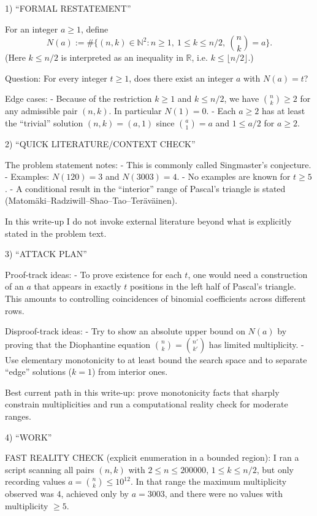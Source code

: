 1) “FORMAL RESTATEMENT”

For an integer $a\ge 1$, define
\[
N(a):=\#\{(n,k)\in\mathbb{N}^2: n\ge 1,\ 1\le k\le n/2,\ \binom{n}{k}=a\}.
\]
(Here $k\le n/2$ is interpreted as an inequality in $\mathbb{R}$, i.e. $k\le \lfloor n/2\rfloor$.)

Question: For every integer $t\ge 1$, does there exist an integer $a$ with $N(a)=t$?

Edge cases:
- Because of the restriction $k\ge 1$ and $k\le n/2$, we have $\binom{n}{k}\ge 2$ for any admissible pair $(n,k)$. In particular $N(1)=0$.
- Each $a\ge 2$ has at least the “trivial” solution $(n,k)=(a,1)$ since $\binom{a}{1}=a$ and $1\le a/2$ for $a\ge 2$.

2) “QUICK LITERATURE/CONTEXT CHECK”

The problem statement notes:
- This is commonly called Singmaster's conjecture.
- Examples: $N(120)=3$ and $N(3003)=4$.
- No examples are known for $t\ge 5$.
- A conditional result in the “interior” range of Pascal's triangle is stated (Matom\"{a}ki--Radziwill--Shao--Tao--Ter\"{a}v\"{a}inen).

In this write-up I do not invoke external literature beyond what is explicitly stated in the problem text.

3) “ATTACK PLAN”

Proof-track ideas:
- To prove existence for each $t$, one would need a construction of an $a$ that appears in exactly $t$ positions in the left half of Pascal's triangle. This amounts to controlling coincidences of binomial coefficients across different rows.

Disproof-track ideas:
- Try to show an absolute upper bound on $N(a)$ by proving that the Diophantine equation $\binom{n}{k}=\binom{n'}{k'}$ has limited multiplicity.
- Use elementary monotonicity to at least bound the search space and to separate “edge” solutions ($k=1$) from interior ones.

Best current path in this write-up: prove monotonicity facts that sharply constrain multiplicities and run a computational reality check for moderate ranges.

4) “WORK”

FAST REALITY CHECK (explicit enumeration in a bounded region):
I ran a script scanning all pairs $(n,k)$ with $2\le n\le 200000$, $1\le k\le n/2$, but only recording values $a=\binom{n}{k}\le 10^{12}$. In that range the maximum multiplicity observed was $4$, achieved only by $a=3003$, and there were no values with multiplicity $\ge 5$.

